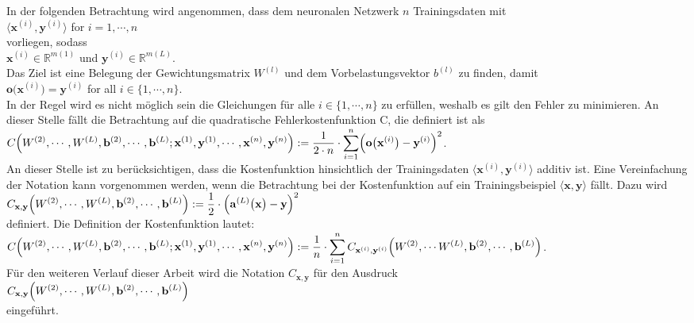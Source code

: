 In der folgenden Betrachtung wird angenommen, dass dem neuronalen Netzwerk $n$ Trainingsdaten mit
\\[0.2cm]
\hspace*{1.3cm}
$\langle \mathbf{x}^{(i)}, \mathbf{y}^{(i)} \rangle$ \quad for $i=1,\cdots,n$ 
\\[0.2cm]
vorliegen, sodass 
\\[0.2cm]
\hspace*{1.3cm}
$\mathbf{x}^{(i)} \in \mathbb{R}^{m(1)}$ und $\mathbf{y}^{(i)} \in \mathbb{R}^{m(L)}$.
\\[0.2cm]
Das Ziel ist eine Belegung der Gewichtungsmatrix $W^{(l)}$ und dem Vorbelastungsvektor $b^{(l)}$ zu finden, damit
\\[0.2cm]
\hspace*{1.3cm}
$\mathbf{o}\bigl(\mathbf{x}^{(i)}\bigr) = \mathbf{y}^{(i)}$ \quad for all $i \in \{1,\cdots,n\}$.
\\[0.2cm]
In der Regel wird es nicht möglich sein die Gleichungen für alle $i \in \{ 1, \cdots ,n \}$ zu erfüllen, weshalb es gilt den Fehler zu minimieren. An dieser Stelle fällt die Betrachtung auf die quadratische Fehlerkostenfunktion C, die definiert ist als
\\[0.2cm]
\hspace*{1.3cm}
$\displaystyle C\Bigr(W^{(2)}, \cdots, W^{(L)}, \mathbf{b}^{(2)}, \cdots, \mathbf{b}^{(L)};
     \mathbf{x}^{(1)}, \mathbf{y}^{(1)}, \cdots, \mathbf{x}^{(n)},\mathbf{y}^{(n)} \Bigr) := 
 \frac{1}{2 \cdot n} \cdot \sum\limits_{i=1}^n \Bigl(\mathbf{o}\bigl(\mathbf{x}^{(i)}\bigr) - \mathbf{y}^{(i)}\Bigr)^2
$.
\\[0.2cm]
An dieser Stelle ist zu berücksichtigen, dass die Kostenfunktion hinsichtlich der Trainingsdaten $\langle \mathbf{x}^{(i)},\mathbf{y}^{(i)} \rangle$ additiv ist. Eine Vereinfachung der Notation kann vorgenommen werden, wenn die Betrachtung bei der Kostenfunktion auf ein Trainingsbeispiel $\langle \mathbf{x},\mathbf{y} \rangle$ fällt. Dazu wird
\\[0.2cm]
\hspace*{1.3cm}
$\displaystyle C_{\mathbf{x}, \mathbf{y}}\Bigr(W^{(2)}, \cdots, W^{(L)}, \mathbf{b}^{(2)}, \cdots, \mathbf{b}^{(L)}\Bigr) := 
 \frac{1}{2} \cdot \Bigl(\mathbf{a}^{(L)}\bigl(\mathbf{x}\bigr) - \mathbf{y}\Bigr)^2
$
\\[0.2cm]
definiert. Die Definition der Kostenfunktion lautet:
\\[0.2cm]
$\displaystyle C\Bigr(W^{(2)}, \cdots, W^{(L)}, \mathbf{b}^{(2)}, \cdots, \mathbf{b}^{(L)};
     \mathbf{x}^{(1)}, \mathbf{y}^{(1)}, \cdots, \mathbf{x}^{(n)},\mathbf{y}^{(n)} \Bigr) := 
 \frac{1}{n} \cdot \sum\limits_{i=1}^n C_{\mathbf{x}^{(i)}, \mathbf{y}^{(i)}}\Bigr(W^{(2)}, \cdots W^{(L)}, \mathbf{b}^{(2)}, \cdots, \mathbf{b}^{(L)}\Bigr) 
$.
\\[0.2cm]
Für den weiteren Verlauf dieser Arbeit wird die Notation $C_{\mathbf{x}, \mathbf{y}}$ für den Ausdruck
\\[0.2cm]
\hspace*{1.3cm}
$\displaystyle C_{\mathbf{x}, \mathbf{y}}\Bigr(W^{(2)}, \cdots, W^{(L)}, \mathbf{b}^{(2)}, \cdots, \mathbf{b}^{(L)}\Bigr)$
\\[0.2cm]
eingeführt.


